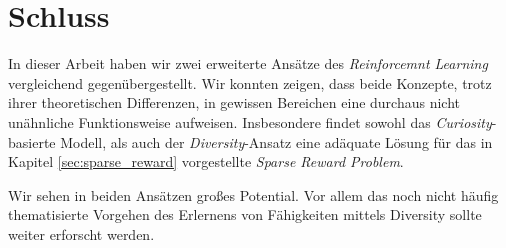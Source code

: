 
\section{Schluss}
\label{sec:conclusion}
In dieser Arbeit haben wir zwei erweiterte Ansätze des \emph{Reinforcemnt Learning} vergleichend gegenübergestellt. Wir konnten zeigen, dass beide Konzepte, trotz ihrer theoretischen Differenzen, in gewissen Bereichen eine durchaus nicht unähnliche Funktionsweise aufweisen. Insbesondere findet sowohl das \emph{Curiosity}-basierte Modell, als auch der \emph{Diversity}-Ansatz eine adäquate Lösung für das in Kapitel \ref{sec:sparse_reward} vorgestellte \emph{Sparse Reward Problem}.


Wir sehen in beiden Ansätzen großes Potential. Vor allem das noch nicht häufig thematisierte Vorgehen des Erlernens von Fähigkeiten mittels Diversity sollte weiter erforscht werden.